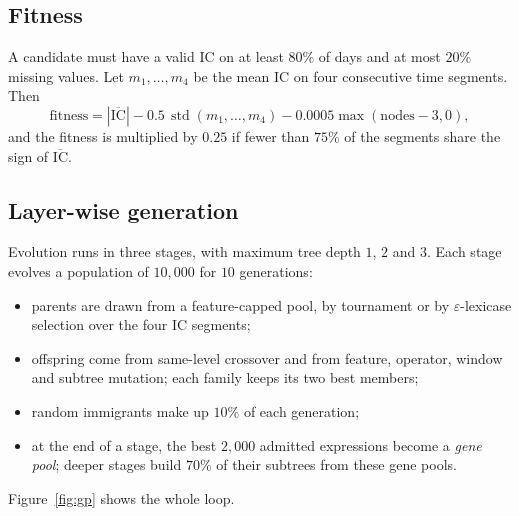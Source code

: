 \documentclass[11pt,a4paper]{article}
\begin{document}
\subsection{Fitness}
\label{sec:fitness}
A candidate must have a valid IC on at least $80\%$ of days and at most $20\%$ missing values. Let $m_1,\dots,m_4$ be the mean IC on four consecutive time segments. Then
\begin{equation}
  \text{fitness} = |\overline{\mathrm{IC}}| - 0.5\,\operatorname{std}(m_1,\dots,m_4) - 0.0005\max(\text{nodes}-3,0),
\end{equation}
and the fitness is multiplied by $0.25$ if fewer than $75\%$ of the segments share the sign of $\overline{\mathrm{IC}}$.

\subsection{Layer-wise generation}
Evolution runs in three stages, with maximum tree depth $1$, $2$ and $3$. Each stage evolves a population of $10{,}000$ for $10$ generations:
\begin{itemize}[nosep]
  \item parents are drawn from a feature-capped pool, by tournament or by $\varepsilon$-lexicase selection over the four IC segments;
  \item offspring come from same-level crossover and from feature, operator, window and subtree mutation; each family keeps its two best members;
  \item random immigrants make up $10\%$ of each generation;
  \item at the end of a stage, the best $2{,}000$ admitted expressions become a \emph{gene pool}; deeper stages build $70\%$ of their subtrees from these gene pools.
\end{itemize}
Figure~\ref{fig:gp} shows the whole loop.
\end{document}
